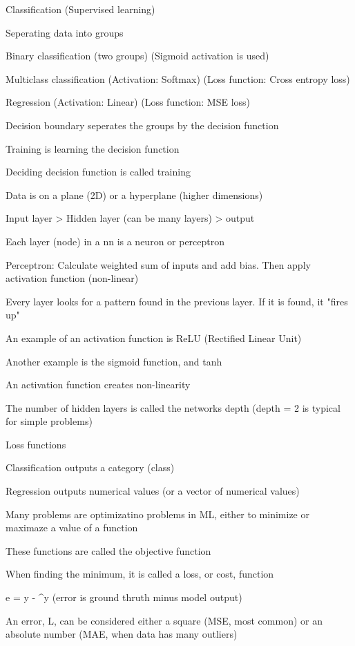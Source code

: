 Classification (Supervised learning)

	Seperating data into groups

	Binary classification (two groups) (Sigmoid activation is used)

	Multiclass classification (Activation: Softmax) (Loss function: Cross entropy loss)

	Regression (Activation: Linear) (Loss function: MSE loss)

	Decision boundary seperates the groups by the decision function

	Training is learning the decision function

	Deciding decision function is called training

	Data is on a plane (2D) or a hyperplane (higher dimensions)

	Input layer > Hidden layer (can be many layers) > output

	Each layer (node) in a nn is a neuron or perceptron

	Perceptron: Calculate weighted sum of inputs and add bias. Then apply activation function (non-linear)

	Every layer looks for a pattern found in the previous layer. If it is found, it "fires up"

	An example of an activation function is ReLU (Rectified Linear Unit)

	Another example is the sigmoid function, and tanh

	An activation function creates non-linearity

	The number of hidden layers is called the networks depth (depth = 2 is typical for simple problems)

Loss functions

	Classification outputs a category (class)

	Regression outputs numerical values (or a vector of numerical values)

	Many problems are optimizatino problems in ML, either to minimize or maximaze a value of a function

	These functions are called the objective function

	When finding the minimum, it is called a loss, or cost, function

	e = y - ^y (error is ground thruth minus model output)

	An error, L, can be considered either a square (MSE, most common) or an absolute number (MAE, when data has many outliers)

